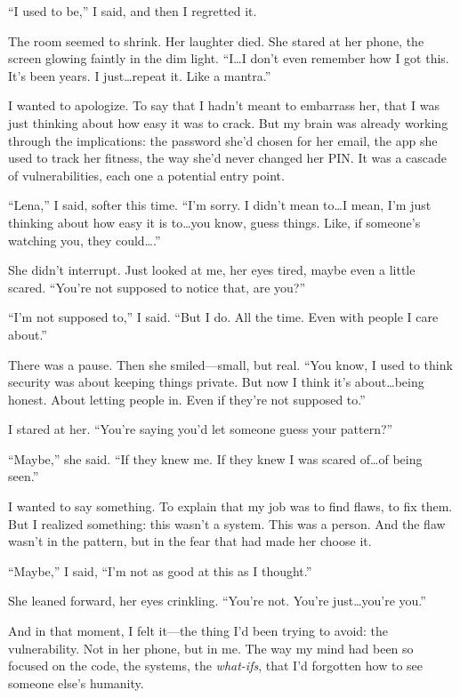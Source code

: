 \documentclass{article}
\theoremstyle{plain}
\theoremstyle{definition}
\theoremstyle{remark}
\begin{document}
\begin{tcolorbox}[colback=green!3, colframe=green!40!black, title=\textbf{RcRL (Ours)}, fonttitle=\bfseries, left=2mm, right=2mm, breakable]
``I used to be,'' I said, and then I regretted it.

The room seemed to shrink. Her laughter died. She stared at her phone, the screen glowing faintly in the dim light. ``I\dots I don’t even remember how I got this. It’s been years. I just\dots repeat it. Like a mantra.''

I wanted to apologize. To say that I hadn’t meant to embarrass her, that I was just thinking about how easy it was to crack. But my brain was already working through the implications: the password she’d chosen for her email, the app she used to track her fitness, the way she’d never changed her PIN. It was a cascade of vulnerabilities, each one a potential entry point.

``Lena,'' I said, softer this time. ``I’m sorry. I didn’t mean to\dots I mean, I’m just thinking about how easy it is to\dots you know, guess things. Like, if someone’s watching you, they could\dots.''

She didn’t interrupt. Just looked at me, her eyes tired, maybe even a little scared. ``You’re not supposed to notice that, are you?''

``I’m not supposed to,'' I said. ``But I do. All the time. Even with people I care about.''

There was a pause. Then she smiled—small, but real. ``You know, I used to think security was about keeping things private. But now I think it’s about\dots being honest. About letting people in. Even if they’re not supposed to.''

I stared at her. ``You’re saying you’d let someone guess your pattern?''

``Maybe,'' she said. ``If they knew me. If they knew I was scared of\dots of being seen.''

I wanted to say something. To explain that my job was to find flaws, to fix them. But I realized something: this wasn’t a system. This was a person. And the flaw wasn’t in the pattern, but in the fear that had made her choose it.

``Maybe,'' I said, ``I’m not as good at this as I thought.''

She leaned forward, her eyes crinkling. ``You’re not. You’re just\dots you’re you.''

And in that moment, I felt it—the thing I’d been trying to avoid: the vulnerability. Not in her phone, but in me. The way my mind had been so focused on the code, the systems, the \textit{what-ifs}, that I’d forgotten how to see someone else’s humanity.


\end{tcolorbox}
\end{document}
